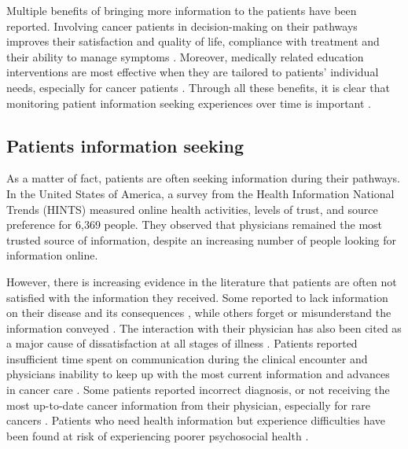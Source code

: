 Multiple benefits of bringing more information to the patients have been
reported. Involving cancer patients in decision-making on their pathways
improves their satisfaction and quality of life, compliance with treatment and
their ability to manage symptoms
\cite{johnson_effects_1982,hack_feasibility_1999,mohide_randomised_1996,mcpherson_effective_2001,
    sheabudgell_information_2014,huchcroft_testing_1984,cegala_patient_2003,viswanath_science_2005}.
Moreover, medically related education interventions are most effective when they
are tailored to patients' individual needs, especially for cancer patients
\cite{cegala_patient_2003}. Through all these benefits, it is clear that
monitoring patient information seeking experiences over time is important
\cite{finney_rutten_cancer-related_2016}.

\subsection{Patients information seeking}

As a matter of fact, patients are often seeking information during their
pathways. In the United States of America, a survey from the Health Information
National Trends (HINTS) \cite{hesse_trust_2005} measured online health
activities, levels of trust, and source preference for 6,369 people. They
observed that physicians remained the most trusted source of information,
despite an increasing number of people looking for information online.

However, there is increasing evidence in the literature that patients are often
not satisfied with the information they received. Some reported to lack
information on their disease and its consequences
\cite{mcpherson_effective_2001}, while others forget or misunderstand the
information conveyed \cite{ley_communicating_1988,hogbin_getting_1989}. The
interaction with their physician has also been cited as a major cause of
dissatisfaction \cite{stewart_effective_1995,bartlett_effects_1984} at all
stages of illness \cite{higginson_palliative_1990}. Patients reported
insufficient time spent on communication during the clinical encounter and
physicians inability to keep up with the most current information and advances
in cancer care \cite{anderson_impact_2003}. Some patients reported incorrect
diagnosis, or not receiving the most up-to-date cancer information from their
physician, especially for rare cancers \cite{dolce_internet_2011}. Patients who
need health information but experience difficulties have been found at risk of
experiencing poorer psychosocial health \cite{arora_barriers_2002}.

